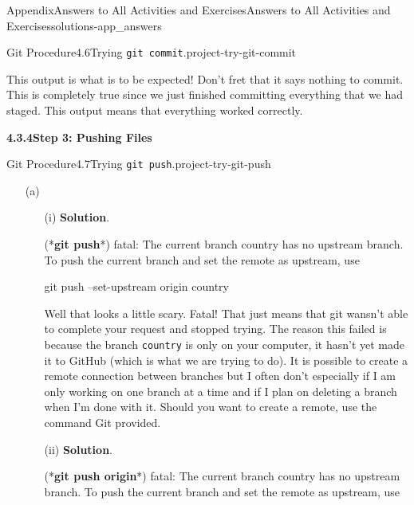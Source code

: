 \documentclass[oneside,10pt,]{book}
\newcommand{\blocktitlefont}{\relax}
\newcommand{\mono}[1]{\texttt{#1}}
\newcommand{\consoleinput}[1]{\textbf{#1}}
\begin{document}
\begin{solutions-chapter}{Appendix}{Answers to All Activities and Exercises}{}{Answers to All Activities and Exercises}{}{}{solutions-app_answers}
\begin{projectsolution}{Git Procedure}{4.6}{Trying \mono{git commit}.}{project-try-git-commit}
\begin{enumerate}[font=\bfseries,label=(\alph*),ref=\alph*]
This output is what is to be expected! Don't fret that it says nothing to commit. This is completely true since we just finished committing everything that we had staged. This output means that everything worked correctly.%
\end{enumerate}%
\end{projectsolution}%
\par\medskip
\noindent\textbf{\Large{}4.3.4\space\textperiodcentered\space{}Step 3: Pushing Files}
\begin{projectsolution}{Git Procedure}{4.7}{Trying \mono{git push}.}{project-try-git-push}%
\begin{enumerate}[font=\bfseries,label=(\alph*),ref=\alph*]%
\item[(a)]\begin{enumerate}[font=\bfseries,label=(\roman*),ref=\theenumi.\roman*]%
\item[(i)]\noindent\textbf{\blocktitlefont Solution}.\hypertarget{solution-try-git-push-c-b-b-back}{}\quad{}\begin{console}{0}{1}{0}
(*\consoleinput{git push}*)
fatal: The current branch country has no upstream branch.
To push the current branch and set the remote as upstream, use

    git push --set-upstream origin country
\end{console}
Well that looks a little scary. Fatal! That just means that git wansn't able to complete your request and stopped trying. The reason this failed is because the branch \mono{country} is only on your computer, it hasn't yet made it to GitHub (which is what we are trying to do). It is possible to create a remote connection between branches but I often don't especially if I am only working on one branch at a time and if I plan on deleting a branch when I'm done with it. Should you want to create a remote, use the command Git provided.%
\item[(ii)]\noindent\textbf{\blocktitlefont Solution}.\hypertarget{solution-try-git-push-c-c-b-back}{}\quad{}\begin{console}{0}{1}{0}
(*\consoleinput{git push origin}*)
fatal: The current branch country has no upstream branch.
To push the current branch and set the remote as upstream, use


\end{console}
\end{enumerate}
\end{enumerate}
\end{projectsolution}
\end{solutions-chapter}
\end{document}
